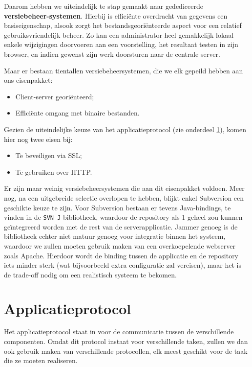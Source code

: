 Daarom hebben we uiteindelijk te stap gemaakt naar gedediceerde \textbf{versiebeheer-systemen}. Hierbij is efficiënte overdracht van gegevens een basiseigenschap, alsook zorgt het bestandsgeoriënteerde aspect voor een relatief gebruiksvriendelijk beheer. Zo kan een administrator heel gemakkelijk lokaal enkele wijzigingen doorvoeren aan een voorstelling, het resultaat testen in zijn browser, en indien gewenst zijn werk doorsturen naar de centrale server.

Maar er bestaan tientallen versiebeheersystemen, die we elk gepeild hebben aan ons eisenpakket:
\begin{itemize}
\item Client-server georiënteerd;
\item Efficiënte omgang met binaire bestanden.
\end{itemize}

Gezien de uiteindelijke keuze van het applicatieprotocol (zie onderdeel \ref{sec:applicatieprotocol}), komen hier nog twee eisen bij:
\begin{itemize}
\item Te beveiligen via SSL;
\item Te gebruiken over HTTP.
\end{itemize}

Er zijn maar weinig versiebeheersystemen die aan dit eisenpakket voldoen. Meer nog, na een uitgebreide selectie overlopen te hebben, blijkt enkel Subversion een geschikte keuze te zijn. Voor Subversion bestaan er tevens Java-bindings, te vinden in de \texttt{SVN-J} bibliotheek, waardoor de repository als 1 geheel zou kunnen geïntegreerd worden met de rest van de serverapplicatie. Jammer genoeg is de bibliotheek echter niet matuur genoeg voor integratie binnen het systeem, waardoor we zullen moeten gebruik maken van een overkoepelende webserver zoals Apache. Hierdoor wordt de binding tussen de applicatie en de repository iets minder sterk (wat bijvoorbeeld extra configuratie zal vereisen), maar het is de trade-off nodig om een realistisch systeem te bekomen.

\section{Applicatieprotocol}
\label{sec:applicatieprotocol}

Het applicatieprotocol staat in voor de communicatie tussen de verschillende componenten. Omdat dit protocol instaat voor verschillende taken, zullen we dan ook gebruik maken van verschillende protocollen, elk meest geschikt voor de taak die ze moeten realiseren.

